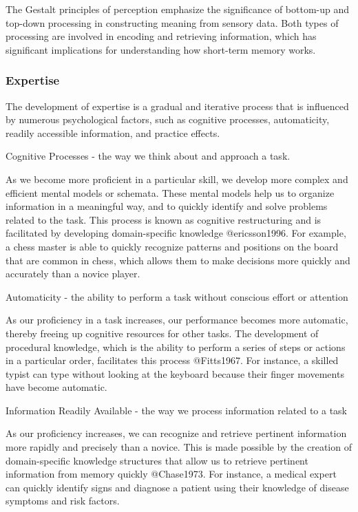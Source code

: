 \documentclass[
]{article}
\begin{document}
The Gestalt principles of perception emphasize the significance of
bottom-up and top-down processing in constructing meaning from sensory
data. Both types of processing are involved in encoding and retrieving
information, which has significant implications for understanding how
short-term memory works.

\hypertarget{expertise}{%
\subsubsection{Expertise}\label{expertise}}

The development of expertise is a gradual and iterative process that is
influenced by numerous psychological factors, such as cognitive
processes, automaticity, readily accessible information, and practice
effects.

Cognitive Processes - the way we think about and approach a task.

As we become more proficient in a particular skill, we develop more
complex and efficient mental models or schemata. These mental models
help us to organize information in a meaningful way, and to quickly
identify and solve problems related to the task. This process is known
as cognitive restructuring and is facilitated by developing
domain-specific knowledge @ericsson1996. For example, a chess master is
able to quickly recognize patterns and positions on the board that are
common in chess, which allows them to make decisions more quickly and
accurately than a novice player.

Automaticity - the ability to perform a task without conscious effort or
attention

As our proficiency in a task increases, our performance becomes more
automatic, thereby freeing up cognitive resources for other tasks. The
development of procedural knowledge, which is the ability to perform a
series of steps or actions in a particular order, facilitates this
process @Fitts1967. For instance, a skilled typist can type without
looking at the keyboard because their finger movements have become
automatic.

Information Readily Available - the way we process information related
to a task

As our proficiency increases, we can recognize and retrieve pertinent
information more rapidly and precisely than a novice. This is made
possible by the creation of domain-specific knowledge structures that
allow us to retrieve pertinent information from memory quickly
@Chase1973. For instance, a medical expert can quickly identify signs
and diagnose a patient using their knowledge of disease symptoms and
risk factors.
\end{document}
